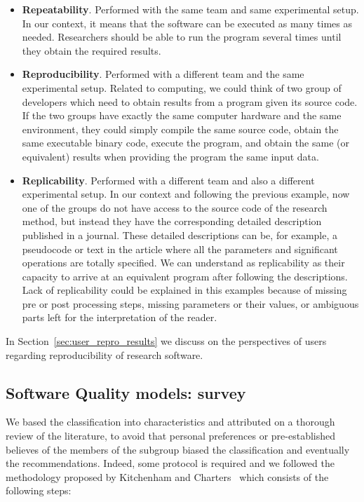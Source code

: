 \begin{itemize}
    \item \textbf{Repeatability}. Performed with the same team and same experimental setup. In our context, it means that the software can be executed as many times as needed. Researchers should be able to run the program several times until they obtain the required results.
    
    \item \textbf{Reproducibility}. Performed with a different team and the same experimental setup. Related to computing, we could think of two group of developers which need to obtain results from a program given its source code. If the two groups have exactly the same computer hardware and the same environment, they could simply compile the same source code, obtain the same executable binary code, execute the program, and obtain the same (or equivalent) results when providing the program the same input data.

    \item \textbf{Replicability}. Performed with a different team and also a different experimental setup. In our context and following the previous example, now one of the groups do not have access to the source code of the research method, but instead they have the corresponding detailed description published in a journal. These detailed descriptions can be, for example, a pseudocode or text in the article where all the parameters and significant operations are totally specified. We can understand as replicability as their capacity to arrive at an equivalent program after following the descriptions. Lack of replicability could be explained in this examples because of missing pre or post processing steps, missing parameters or their values, or ambiguous parts left for the interpretation of the reader.
\end{itemize}

In Section~\ref{sec:user_repro_results} we discuss on the perspectives of users regarding reproducibility of research software.

\subsection{Software Quality models: survey}

We based the classification into characteristics and attributed on a thorough review of the literature, to avoid that personal preferences or pre-established believes of the members of the subgroup biased the classification and eventually the recommendations. Indeed, some protocol is required and we followed the methodology proposed by Kitchenham and Charters~\cite{keele2007guidelines} which consists of the following steps:

